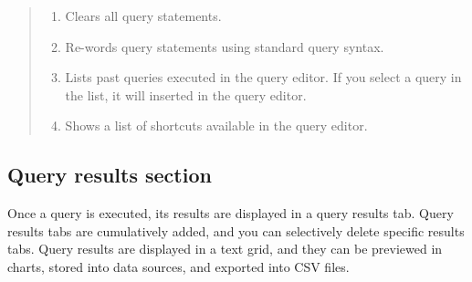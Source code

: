 \documentclass[letterpaper,10pt,english]{sphinxmanual}
\begin{document}
\begin{quote}
\begin{enumerate}
\item {} 
 Clears all query statements.

\item {} 
 Re-words query statements using standard query syntax.

\item {} 
 Lists past queries executed in the query editor. If you select a query in the list, it will inserted in the query editor.

\item {} 
 Shows a list of shortcuts available in the query editor.

\end{enumerate}
\end{quote}


\subsection{Query results section}
\label{\detokenize{discovery/part06/06_03-use_a_workbench:workbench-use-4}}\label{\detokenize{discovery/part06/06_03-use_a_workbench:id5}}
Once a query is executed, its results are displayed in a query results tab. Query results tabs are cumulatively added, and you can selectively delete specific results tabs. Query results are displayed in a text grid, and they can be previewed in charts, stored into data sources, and exported into CSV files.
\end{document}
